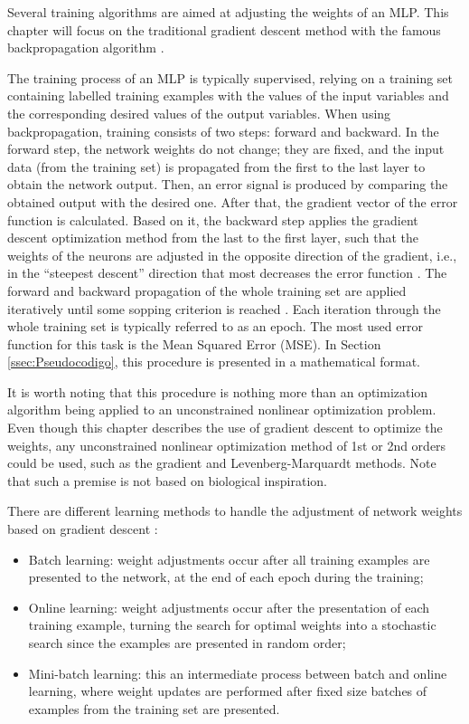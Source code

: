 Several training algorithms are aimed at adjusting the weights of an MLP. This chapter will focus on the traditional gradient descent method with the famous backpropagation algorithm \cite{rumelhart1986learning}.

The training process of an MLP is typically supervised, relying on a training set containing labelled training examples with the values of the input variables and the corresponding desired values of the output variables. When using backpropagation, training consists of two steps: forward and backward. In the forward step, the network weights do not change; they are fixed, and the input data (from the training set) is propagated from the first to the last layer to obtain the network output. Then, an error signal is produced by comparing the obtained output with the desired one. After that, the gradient vector of the error function is calculated. Based on it, the backward step applies the gradient descent optimization method from the last to the first layer, such that the weights of the neurons are adjusted in the opposite direction of the gradient, i.e., in the ``steepest descent'' direction that most decreases the error function \cite{haykin}. The forward and backward propagation of the whole training set are applied iteratively until some sopping criterion is reached \cite{Castro2006FundamentalsON}. Each iteration through the whole training set is typically referred to as an epoch. The most used error function for this task is the Mean Squared Error (MSE).  In Section \ref{ssec:Pseudocodigo}, this procedure is presented in a mathematical format. 

It is worth noting that this procedure is nothing more than an optimization algorithm being applied to an unconstrained nonlinear optimization problem. Even though this chapter describes the use of gradient descent to optimize the weights, any unconstrained nonlinear optimization method of 1st or 2nd orders could be used, such as the gradient and Levenberg-Marquardt methods. Note that such a premise is not based on biological inspiration.

There are different learning methods to handle the adjustment of network weights based on gradient descent \cite{haykin, Bengio2012}:

\begin{itemize}
	\item Batch learning: weight adjustments occur after all training examples are presented to the network, at the end of each epoch during the training;
	\item Online learning: weight adjustments occur after the presentation of each training example, turning the search for optimal weights into a stochastic search since the examples are presented in random order;
	\item Mini-batch learning: this an intermediate process between batch and online learning, where weight updates are performed after fixed size batches of examples from the training set are presented.
\end{itemize}

